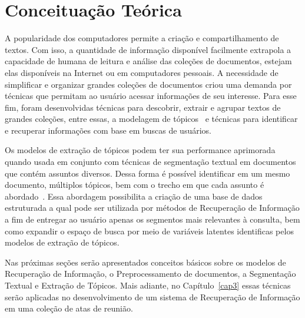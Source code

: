 \chapter{Conceituação Teórica}\label{cap2}


A popularidade dos computadores permite a criação e compartilhamento de textos. Com isso, a quantidade de informação disponível facilmente extrapola a capacidade de humana de leitura e análise das coleções de documentos, estejam elas disponíveis na Internet ou em computadores pessoais. A necessidade de simplificar e organizar grandes coleções de documentos criou uma demanda por técnicas que permitam ao usuário acessar informações de seu interesse. Para esse fim, foram desenvolvidas técnicas para descobrir, extrair e agrupar textos de grandes coleções, entre essas, a modelagem de tópicos~\cite{Hofmann1999,Deerwester1990,Lee1999,Blei2012} e técnicas para identificar e recuperar informações com base em buscas de usuários.  



Os modelos de extração de tópicos podem ter sua performance aprimorada quando usada em conjunto com técnicas de segmentação textual em documentos que contém assuntos diversos. Dessa forma é possível identificar em um mesmo documento, múltiplos tópicos, bem com o trecho em que cada assunto é abordado~\cite{Tagarelli2013, Cuong2011}. Essa abordagem possibilita a criação de uma base de dados estruturada a qual pode ser utilizada por métodos de Recuperação de Informação a fim de entregar ao usuário apenas os segmentos mais relevantes à consulta, bem como expandir o espaço de busca por meio de variáveis latentes identificas pelos modelos de extração de tópicos.




Nas próximas seções serão apresentados conceitos básicos sobre os modelos de Recuperação de Informação, o Preprocessamento de documentos, a Segmentação Textual e Extração de Tópicos. Mais adiante, no Capítulo~\ref{cap3} essas técnicas serão aplicadas no desenvolvimento de um sistema de Recuperação de Informação em uma coleção de atas de reunião.




